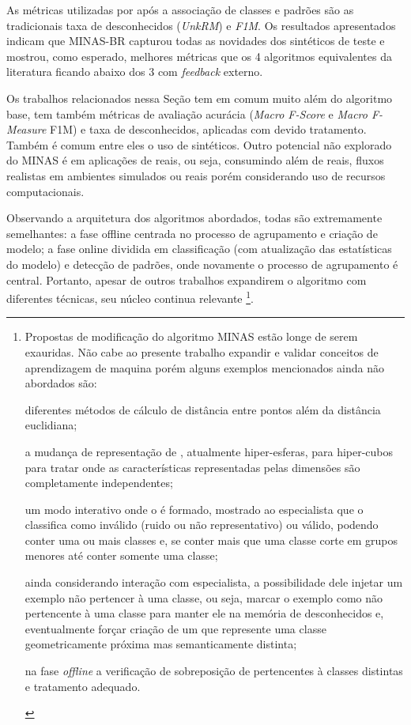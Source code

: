As métricas utilizadas por  após a associação de classes e padrões são
as tradicionais taxa de desconhecidos (\emph{UnkRM}) e \emph{F1M}.
Os resultados apresentados indicam que MINAS-BR capturou todas as novidades dos \datasets sintéticos de teste
e mostrou, como esperado, melhores métricas que os 4 algoritmos equivalentes da literatura ficando abaixo
dos 3 com \emph{feedback} externo.

Os trabalhos relacionados nessa Seção tem em comum muito além do algoritmo base,
tem também métricas de avaliação acurácia (\emph{Macro F-Score} e \emph{Macro F-Measure} F1M)
e taxa de desconhecidos, aplicadas com devido tratamento.
Também é comum entre eles o uso de \datasets sintéticos.
Outro potencial não explorado do MINAS é em aplicações de reais, ou seja,
consumindo além de \datasets reais, fluxos realistas em ambientes simulados ou reais porém
considerando uso de recursos computacionais.

Observando a arquitetura dos algoritmos abordados, todas são extremamente semelhantes:
a fase offline centrada no processo de agrupamento e criação de modelo;
a fase online dividida em classificação (com atualização das estatísticas do modelo)
e detecção de padrões, onde novamente o processo de agrupamento é central.
Portanto, apesar de outros trabalhos expandirem o algoritmo com diferentes técnicas, seu
núcleo continua relevante \cite{DaSilva2018,DaSilva2018thesis,Costa2019}\footnote{
Propostas de modificação do algoritmo MINAS estão longe de serem exauridas.
Não cabe ao presente trabalho expandir e validar conceitos de aprendizagem de maquina
porém alguns exemplos mencionados ainda não abordados são: \begin{enumerate*}[label={\alph*)}]
    \item diferentes métodos de cálculo de distância entre pontos além da distância euclidiana; 
    \item a mudança de representação de \clusters, atualmente hiper-esferas, para hiper-cubos
    para tratar \datasets onde as características representadas
    pelas dimensões são completamente independentes;
    \item um modo interativo onde o \cluster é formado, mostrado ao especialista
    que o classifica como inválido (ruido ou não representativo) ou válido, podendo conter
    uma ou mais classes e, se conter mais que uma classe corte em grupos menores até conter somente
    uma classe;
    \item ainda considerando interação com especialista, a possibilidade dele injetar 
    um exemplo não pertencer à uma classe, ou seja, marcar o exemplo como não
    pertencente à uma classe para manter ele na memória de desconhecidos e, eventualmente forçar
    criação de um \cluster que represente uma classe geometricamente próxima mas semanticamente distinta;
    \item na fase \emph{offline} a verificação de sobreposição de \clusters pertencentes à
    classes distintas e tratamento adequado.
\end{enumerate*} 
}.

